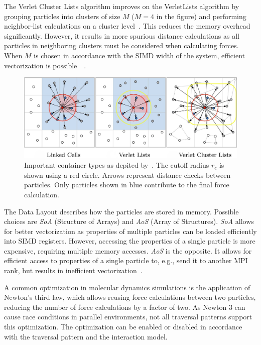 \documentclass[conference]{IEEEtran}
\begin{document}
\begin{description}[style=nextline]
\begin{description}[style=nextline, font=\itshape]
            \item[$\bullet$ Verlet Cluster Lists]
                The Verlet Cluster Lists algorithm improves on the VerletLists algorithm by grouping particles into clusters of size $M$ ($M=4$ in the figure) and performing neighbor-list calculations on a cluster level~\cite{PALL20132641}. This reduces the memory overhead significantly. However, it results in more spurious distance calculations as all particles in neighboring clusters must be considered when calculating forces. When $M$ is chosen in accordance with the SIMD width of the system, efficient vectorization is possible~\cite{Gratl2022AutoPas}~\cite{PALL20132641}.
        \end{description}

        \begin{figure}[h]
            \centering
            \includegraphics[width=\columnwidth]{figures/containers.jpg}
            \caption{Important container types as depited by~\cite{Gratl2022AutoPas}. The cutoff radius $r_c$ is shown using a red circle. Arrows represent distance checks between particles. Only particles shown in blue contribute to the final force calculation.}
            \label{fig_containers}
        \end{figure}

    \item[Data Layout]
        The Data Layout describes how the particles are stored in memory. Possible choices are \textit{SoA} (Structure of Arrays) and \textit{AoS} (Array of Structures). \textit{SoA} allows for better vectorization as properties of multiple particles can be loaded efficiently into SIMD registers. However, accessing the properties of a single particle is more expensive, requiring
        multiple memory accesses. \textit{AoS} is the opposite. It allows for efficient access to properties of a single particle to, e.g., send it to another MPI rank, but results in inefficient vectorization~\cite{Gratl2022AutoPas}.

    \item[Newton 3]
        A common optimization in molecular dynamics simulations is the application of Newton's third law, which allows reusing force calculations between two particles, reducing the number of force calculations by a factor of two. As Newton 3 can cause race conditions in parallel environments, not all traversal patterns support this optimization. The optimization can be enabled or disabled in accordance with the traversal pattern and the interaction model.


\end{description}
\end{document}
